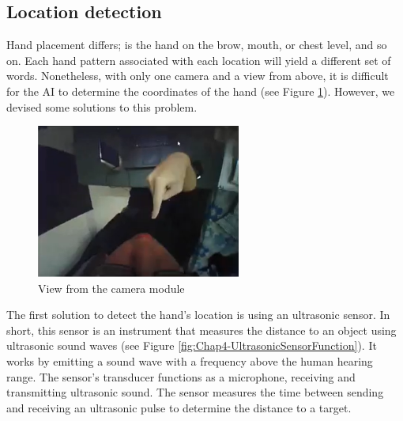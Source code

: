 \subsection{Location detection}\label{sec:locationDetection}

Hand placement differs; is the hand on the brow, mouth, or chest level, and so on. Each hand pattern associated with each location will yield a different set of words. Nonetheless, with only one camera and a view from above, it is difficult for the AI to determine the coordinates of the hand (see Figure \ref{fig:Chap4-ViewFromCamera}). However, we devised some solutions to this problem.


\begin{figure}[H]
	\centering
	\includegraphics[width=0.6\textwidth]{img/Chap4/ViewFromCamera.png}
	\caption{View from the camera module}
	\label{fig:Chap4-ViewFromCamera}
\end{figure}


The first solution to detect the hand's location is using an ultrasonic sensor. In short, this sensor is an instrument that measures the distance to an object using ultrasonic sound waves (see Figure \ref{fig:Chap4-UltrasonicSensorFunction}). It works by emitting a sound wave with a frequency above the human hearing range. The sensor's transducer functions as a microphone, receiving and transmitting ultrasonic sound. The sensor measures the time between sending and receiving an ultrasonic pulse to determine the distance to a target.

